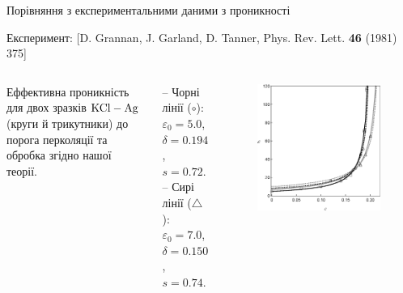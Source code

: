 \documentclass[10pt]{beamer}
\begin{document}
\begin{frame}{Порівняння з експериментальними даними з проникності}

    \scriptsize{Експеримент: [D. Grannan, J. Garland, D. Tanner, Phys. Rev. Lett. {\bf 46} (1981) 375]}
    \footnotesize

\begin{columns}[T,onlytextwidth]
    \vspace{10pt}
      Еффективна проникність для двох зразків $\rm KCl-Ag$ (круги й трикутники) до порога перколяції та обробка згідно нашої теорії. 
      
      \vspace{5pt}
      -- Чорні лінії ($\circ$):\\
      $\varepsilon_0 = 5.0$, \\
      $\delta = 0.194$, \\
      $s = 0.72$. \\
      -- Сирі лінії ($\bigtriangleup$):\\
      $\varepsilon_0 = 7.0$, \\
      $\delta = 0.150$, \\
      $s = 0.74$.
      

      \begin{figure}
        \centering
        \includegraphics[width=0.99\textwidth]{images/KCl-Ag-eps.eps}
      \end{figure}
\end{columns}

\end{frame}
\end{document}
